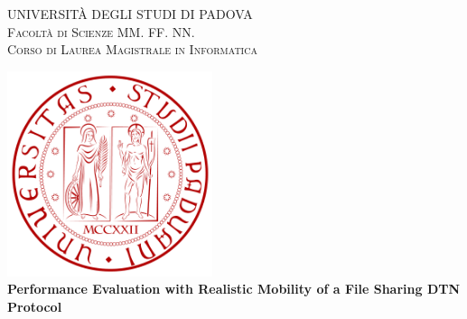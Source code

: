 
\begin{titlepage}
    \begin{center}
        {\Large UNIVERSITÀ DEGLI STUDI DI PADOVA}\\
        \vspace{0.2cm}                                                  %
        {\Large \scshape Facoltà di Scienze MM. FF. NN.}\\
        \vspace{2mm}
        {\Large \scshape Corso di Laurea Magistrale in Informatica}\\
        
        \vspace{2cm}
        
        \includegraphics[width=6cm]{figure/unipd_logo}\\
        
        
        \vspace{2cm}
        {\LARGE \bfseries Performance Evaluation with Realistic Mobility of a File Sharing DTN Protocol} \\
        \vspace{2.5cm}
    \end{center}


\end{titlepage}
